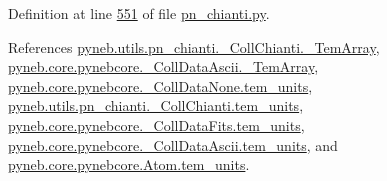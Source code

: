 Definition at line \hyperlink{pn__chianti_8py_source_l00551}{551} of file \hyperlink{pn__chianti_8py_source}{pn\-\_\-chianti.\-py}.



References \hyperlink{pn__chianti_8py_source_l00437}{pyneb.\-utils.\-pn\-\_\-chianti.\-\_\-\-Coll\-Chianti.\-\_\-\-Tem\-Array}, \hyperlink{pynebcore_8py_source_l01000}{pyneb.\-core.\-pynebcore.\-\_\-\-Coll\-Data\-Ascii.\-\_\-\-Tem\-Array}, \hyperlink{pynebcore_8py_source_l00081}{pyneb.\-core.\-pynebcore.\-\_\-\-Coll\-Data\-None.\-tem\-\_\-units}, \hyperlink{pn__chianti_8py_source_l00436}{pyneb.\-utils.\-pn\-\_\-chianti.\-\_\-\-Coll\-Chianti.\-tem\-\_\-units}, \hyperlink{pynebcore_8py_source_l00589}{pyneb.\-core.\-pynebcore.\-\_\-\-Coll\-Data\-Fits.\-tem\-\_\-units}, \hyperlink{pynebcore_8py_source_l00944}{pyneb.\-core.\-pynebcore.\-\_\-\-Coll\-Data\-Ascii.\-tem\-\_\-units}, and \hyperlink{pynebcore_8py_source_l01290}{pyneb.\-core.\-pynebcore.\-Atom.\-tem\-\_\-units}.


